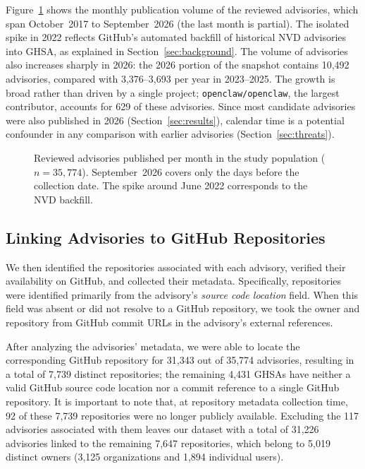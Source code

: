 \documentclass[smallextended,natbib]{svjour3}
\newcommand{\tool}[1]{\texttt{#1}}
\begin{document}
Figure~\ref{fig:population-monthly} shows the monthly publication volume of
the reviewed advisories, which span October~2017 to September~2026 (the last
month is partial).  The isolated spike in 2022 reflects GitHub’s automated backfill of historical NVD advisories into GHSA, as
explained in Section~\ref{sec:background}. The volume of advisories also increases sharply in 2026:
the 2026 portion of the snapshot contains 10,492 advisories, compared with
3,376--3,693 per year in 2023--2025.  The growth is broad rather than driven by
a single project; \tool{openclaw/openclaw}, the largest contributor, accounts
for 629 of these advisories.  Since most candidate advisories were also
published in 2026 (Section~\ref{sec:results}), calendar time is a potential
confounder in any comparison with earlier advisories
(Section~\ref{sec:threats}).

\begin{figure}[!ht]
\centering

\caption{Reviewed advisories published per month in the study population
($n=35{,}774$). September~2026 covers only the days before the collection
date. The spike around June 2022 corresponds to the NVD backfill.}
\label{fig:population-monthly}
\end{figure}

\subsection{Linking Advisories to GitHub Repositories}
\label{sub:linking-advisories}
We then identified the repositories associated with each advisory,
verified their availability on GitHub, and collected their metadata.
Specifically, repositories were identified primarily from the advisory's \textit{source code
location} field.  When this field was absent or did not resolve to a GitHub
repository, we took the owner and repository from GitHub commit URLs in the
advisory's external references.


After analyzing the advisories' metadata, we were able to locate the corresponding GitHub repository for  31,343 out of 35,774 advisories, resulting in a total of 7,739 distinct repositories; the remaining 4,431 GHSAs have neither a valid GitHub source code location nor a commit reference to a single GitHub repository.  
It is important to note that, at repository metadata collection time, 92 of these 7,739 repositories were no longer publicly available. 
Excluding the 117 advisories associated with them leaves our dataset  with a total of 31,226 advisories linked to the remaining 7,647 repositories, which belong to 5,019 distinct owners (3,125
organizations and 1,894 individual users).
\end{document}
